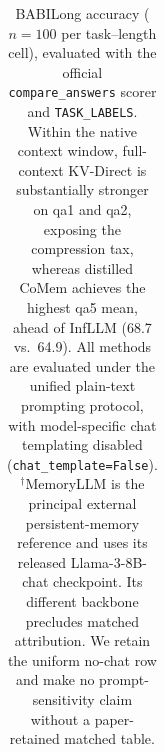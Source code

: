 \begin{table}[!htbp]
\begin{tabular}{@{}llrrrrrrrr@{}}
\bottomrule
\end{tabular}
\caption{BABILong accuracy ($n{=}100$ per task--length cell), evaluated with
the official \texttt{compare\_answers} scorer and \texttt{TASK\_LABELS}.
Within the native context window, full-context KV-Direct is substantially
stronger on qa1 and qa2, exposing the compression tax, whereas distilled CoMem
achieves the highest qa5 mean, ahead of InfLLM (68.7 vs.\ 64.9).
All methods are evaluated under the unified plain-text prompting protocol,
with model-specific chat templating disabled
(\texttt{chat\_template=False}).
$^{\dagger}$MemoryLLM is the principal external persistent-memory reference and
uses its released Llama-3-8B-chat checkpoint. Its different backbone precludes
matched attribution. We retain the uniform no-chat row and make no
prompt-sensitivity claim without a paper-retained matched table.}
\label{tab:babilong}
\end{table}
